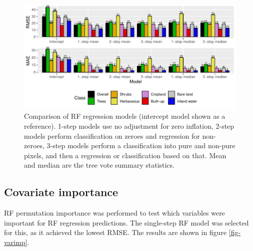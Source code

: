 \documentclass[review,authoryear,3p]{elsarticle}
\begin{document}
\begin{figure}
    \centering
    \includegraphics[width=\textwidth]{article/article-figures/barplots/2020-06-04-rf-comparison-bar}
    \caption{Comparison of \gls{RF} regression models (intercept model shown as a reference). 1-step models use no adjustment for zero inflation, 2-step models perform classification on zeroes and regression for non-zeroes, 3-step models perform a classification into pure and non-pure pixels, and then a regression or classification based on that. Mean and median are the tree vote summary statistics.}
    \label{fig-randomforest}
\end{figure}

\subsection{Covariate importance}

\Gls{RF} permutation importance was performed to test which variables were important for \gls{RF} regression predictions.
The single-step \gls{RF} model was selected for this, as it achieved the lowest \gls{RMSE}.
The results are shown in figure \ref{fig-varimp}.
\end{document}
